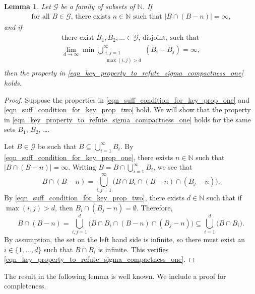 \documentclass[letter,11pt]{article}
\theoremstyle{plain}
\newtheorem{lemma}[theorem]{Lemma}
\theoremstyle{definition}
\theoremstyle{plain}
\theoremstyle{plain}
\numberwithin{equation}{section}
\newcommand{\N}{\mathbb{N}}
\newcommand{\classtwo}{\mathscr{G}}
\begin{document}
\begin{lemma}
\label{lemma_suff_condition_for_key_property_for_dual_not_sigma_compact}
    Let $\classtwo$ be a family of subsets of $\N$.  If
    \begin{align}
        \label{eqn_suff_condition_for_key_prop_one}
        \text{for all $B \in \classtwo$, there exists $n \in \N$ such that $|B \cap (B-n)| = \infty$,}
    \end{align}
    and if
        \begin{align}
        \label{eqn_suff_condition_for_key_prop_two}
        \begin{gathered}
            \text{there exist $B_1, B_2, \ldots \in \classtwo$, disjoint, such that} \\ \lim_{d \to \infty} \min \bigcup_{\substack{i, j = 1 \\ \max(i,j) > d}}^\infty (B_i - B_j) = \infty,
        \end{gathered}
    \end{align}
    then the property in \eqref{eqn_key_property_to_refute_sigma_compactness_one} holds.
\end{lemma}

\begin{proof}
    Suppose the properties in \eqref{eqn_suff_condition_for_key_prop_one} and \eqref{eqn_suff_condition_for_key_prop_two} hold.  We will show that the property in \eqref{eqn_key_property_to_refute_sigma_compactness_one} holds for the same sets $B_1$, $B_2$, \dots.

    Let $B \in \classtwo$ be such that $B \subseteq \bigcup_ {i=1}^\infty B_i$.  By \eqref{eqn_suff_condition_for_key_prop_one}, there exists $n \in \N$ such that $|B \cap (B-n)| = \infty$.  Writing $B = B \cap \bigcup_{i=1}^\infty B_i$, we see that
    \[B \cap (B-n) = \bigcup_{i,j = 1}^\infty \big( B \cap B_i \cap (B-n) \cap (B_j - n)\big).\]
    By \eqref{eqn_suff_condition_for_key_prop_two}, there exists $d \in \N$ such that if $\max(i,j) > d$, then $B_i \cap (B_j - n) = \emptyset$.  Therefore,
        \[B \cap (B-n) = \bigcup_{i,j = 1}^d \big( B \cap B_i \cap (B-n) \cap (B_j - n)\big) \subseteq \bigcup_{i=1}^d \big( B \cap B_i \big).\]
    By assumption, the set on the left hand side is infinite, so there must exist an $i \in \{1, \ldots, d\}$ such that $B \cap B_i$ is infinite.  This verifies \eqref{eqn_key_property_to_refute_sigma_compactness_one}.
\end{proof}


The result in the following lemma is well known.  We include a proof for completeness.
\end{document}
